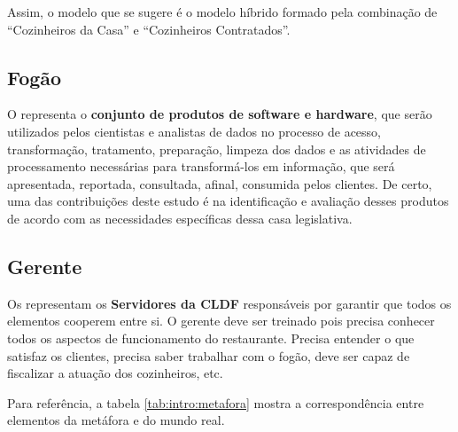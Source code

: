     Assim, o modelo que se sugere é o modelo híbrido formado pela combinação de ``Cozinheiros da Casa'' e ``Cozinheiros Contratados''. 

\subsection*{Fogão}
\label{sub-fogao}

    O \FOGAO \xspace representa o \textbf{conjunto de produtos de software e hardware}, que serão utilizados pelos cientistas e analistas de dados no processo de acesso, transformação, tratamento, preparação, limpeza dos dados e as atividades de processamento necessárias para transformá-los em informação, que será apresentada, reportada, consultada, afinal, consumida pelos clientes. De certo, uma das contribuições deste estudo é na identificação e avaliação desses produtos de acordo com as necessidades específicas dessa casa legislativa.

\subsection*{Gerente}
\label{sub-gerente}

    Os \GERENTES \xspace representam os \textbf{Servidores da CLDF} responsáveis por garantir que todos os elementos cooperem entre si. O gerente deve ser treinado pois precisa conhecer todos os aspectos de funcionamento do restaurante. Precisa entender o que satisfaz os clientes, precisa saber trabalhar com o fogão, deve ser capaz de fiscalizar a atuação dos cozinheiros, etc. 


    Para referência, a tabela \ref{tab:intro:metafora} mostra a correspondência entre elementos da metáfora e do mundo real.


